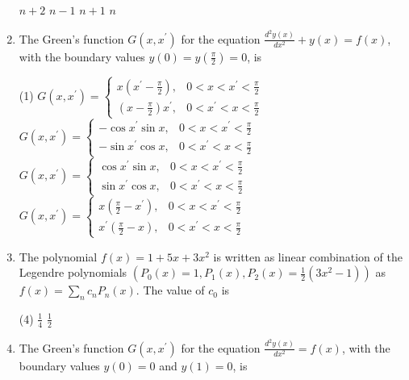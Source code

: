 \begin{enumerate}[label=\color{ocre}\textbf{\arabic*.}]
\begin{tasks}
		\task[\textbf{A.}] $n+2$
		\task[\textbf{B.}]  $n-1$
		\task[\textbf{C.}] $n+1$
		\task[\textbf{D.}] $n$
	\end{tasks}
	\item  The Green's function $G\left(x, x^{\prime}\right)$ for the equation $\frac{d^{2} y(x)}{d x^{2}}+y(x)=f(x)$, with the boundary values $y(0)=y\left(\frac{\pi}{2}\right)=0$, is
	{}
	\begin{tasks}(1)
		\task[\textbf{A.}] $G\left(x, x^{\prime}\right)=\left\{\begin{array}{ll}x\left(x^{\prime}-\frac{\pi}{2}\right), & 0<x<x^{\prime}<\frac{\pi}{2} \\ \left(x-\frac{\pi}{2}\right) x^{\prime}, & 0<x^{\prime}<x<\frac{\pi}{2}\end{array}\right.$
		\task[\textbf{B.}] $G\left(x, x^{\prime}\right)=\left\{\begin{array}{ll}-\cos x^{\prime} \sin x, & 0<x<x^{\prime}<\frac{\pi}{2} \\ -\sin x^{\prime} \cos x, & 0<x^{\prime}<x<\frac{\pi}{2}\end{array}\right.$
		\task[\textbf{C.}] $G\left(x, x^{\prime}\right)=\left\{\begin{array}{ll}\cos x^{\prime} \sin x, & 0<x<x^{\prime}<\frac{\pi}{2} \\ \sin x^{\prime} \cos x, & 0<x^{\prime}<x<\frac{\pi}{2}\end{array}\right.$
		\task[\textbf{D.}] $G\left(x, x^{\prime}\right)=\left\{\begin{array}{ll}x\left(\frac{\pi}{2}-x^{\prime}\right), & 0<x<x^{\prime}<\frac{\pi}{2} \\ x^{\prime}\left(\frac{\pi}{2}-x\right), & 0<x^{\prime}<x<\frac{\pi}{2}\end{array}\right.$
	\end{tasks}
	\item The polynomial $f(x)=1+5 x+3 x^{2}$ is written as linear combination of the Legendre polynomials
	$\left(P_{0}(x)=1, P_{1}(x), P_{2}(x)=\frac{1}{2}\left(3 x^{2}-1\right)\right)$ as $f(x)=\sum_{n} c_{n} P_{n}(x)$. The value of $c_{0}$ is
	{}
	\begin{tasks}(4)
		\task[\textbf{A.}] $\frac{1}{4}$
		\task[\textbf{B.}] $\frac{1}{2}$
	\end{tasks}
	\item The Green's function $G\left(x, x^{\prime}\right)$ for the equation $\frac{d^{2} y(x)}{d x^{2}}=f(x)$, with the boundary values $y(0)=0$ and $y(1)=0$, is

\end{enumerate}
